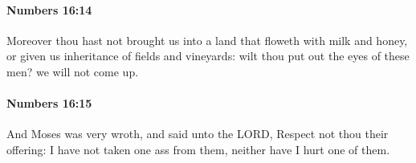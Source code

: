 		\paragraph{Numbers 16:14} %
			\label{NUMBERS-16-14}

			Moreover thou hast not brought us into a land that floweth with milk and honey, or given us inheritance of fields and vineyards: wilt thou put out the eyes of these men? we will not come up.


		\paragraph{Numbers 16:15} %
			\label{NUMBERS-16-15}

			And Moses was very wroth, and said unto the LORD, Respect not thou their offering: I have not taken one ass from them, neither have I hurt one of them.


